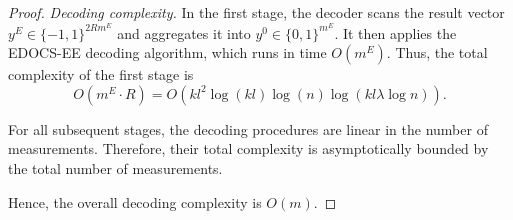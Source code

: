 \documentclass{article}
\begin{document}
\begin{proof}
\medskip

\emph{Decoding complexity.}
In the first stage, the decoder scans the result vector $y^E \in \{-1,1\}^{2R m^E}$ and aggregates it into $y^0 \in \{0,1\}^{m^E}$. It then applies the EDOCS-EE decoding algorithm, which runs in time $O(m^E)$. Thus, the total complexity of the first stage is
\[
O(m^E \cdot R)
= O\!\left(kl^2 \log(kl)\log (n) \log(kl\lambda \log n)\right).
\]

For all subsequent stages, the decoding procedures are linear in the number of measurements. Therefore, their total complexity is asymptotically bounded by the total number of measurements.

\medskip

Hence, the overall decoding complexity is
$O(m)$.
\end{proof}
\end{document}
